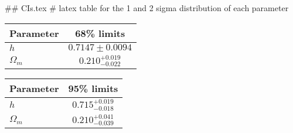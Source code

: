 ## CIs.tex
# latex table for the 1 and 2 sigma distribution of each parameter

\begin{tabular} { l  c}
 Parameter &  68\% limits\\
\hline
{\boldmath$h              $} & $0.7147\pm 0.0094          $\\
{\boldmath$\Omega_m       $} & $0.210^{+0.019}_{-0.022}   $\\
\hline
\end{tabular}

\begin{tabular} { l  c}
 Parameter &  95\% limits\\
\hline
{\boldmath$h              $} & $0.715^{+0.019}_{-0.018}   $\\
{\boldmath$\Omega_m       $} & $0.210^{+0.041}_{-0.039}   $\\
\hline
\end{tabular}
